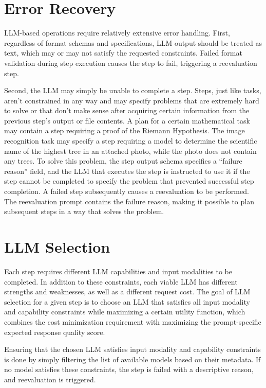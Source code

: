 \documentclass[a4paper,11pt,twoside]{report}
\theoremstyle{definition}
\begin{document}
\section{Error Recovery}
\label{section:error-recovery}

LLM-based operations require relatively extensive error handling. First, regardless of format schemas and specifications, LLM output should be treated as text, which may or may not satisfy the requested constraints. Failed format validation during step execution causes the step to fail, triggering a reevaluation step. 

Second, the LLM may simply be unable to complete a step. Steps, just like tasks, aren't constrained in any way and may specify problems that are extremely hard to solve or that don't make sense after acquiring certain information from the previous step's output or file contents. A plan for a certain mathematical task may contain a step requiring a proof of the Riemann Hypothesis. The image recognition task may specify a step requiring a model to determine the scientific name of the highest tree in an attached photo, while the photo does not contain any trees. To solve this problem, the step output schema specifies a ``failure reason'' field, and the LLM that executes the step is instructed to use it if the step cannot be completed to specify the problem that prevented successful step completion. A failed step subsequently causes a reevaluation to be performed. The reevaluation prompt contains the failure reason, making it possible to plan subsequent steps in a way that solves the problem.

\section{LLM Selection}
\label{section:llm-selection}

Each step requires different LLM capabilities and input modalities to be completed. In addition to these constraints, each viable LLM has different strengths and weaknesses, as well as a different request cost. The goal of LLM selection for a given step is to choose an LLM that satisfies all input modality and capability constraints while maximizing a certain utility function, which combines the cost minimization requirement with maximizing the prompt-specific expected response quality score.

Ensuring that the chosen LLM satisfies input modality and capability constraints is done by simply filtering the list of available models based on their metadata. If no model satisfies these constraints, the step is failed with a descriptive reason, and reevaluation is triggered.
\end{document}
